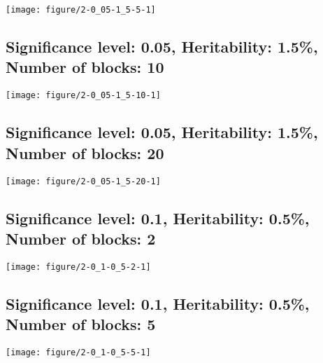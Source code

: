 \documentclass[11pt,letter]{article}\usepackage[]{graphicx}\usepackage[]{color}
\makeatletter
\def\maxwidth{ %
  \ifdim\Gin@nat@width>\linewidth
    \linewidth
  \else
    \Gin@nat@width
  \fi
}
\newenvironment{knitrout}{}{} %
\makeatother
\begin{document}
\begin{knitrout}
\color{fgcolor}
\texttt{[image: figure/2-0\_05-1\_5-5-1]} 

\end{knitrout}

\newpage
\subsection{Significance level: 0.05, Heritability: 1.5\%, Number of blocks: 10}

\begin{knitrout}
\color{fgcolor}
\texttt{[image: figure/2-0\_05-1\_5-10-1]} 

\end{knitrout}

\newpage
\subsection{Significance level: 0.05, Heritability: 1.5\%, Number of blocks: 20}

\begin{knitrout}
\color{fgcolor}
\texttt{[image: figure/2-0\_05-1\_5-20-1]} 

\end{knitrout}

\newpage
\subsection{Significance level: 0.1, Heritability: 0.5\%, Number of blocks: 2}

\begin{knitrout}
\color{fgcolor}
\texttt{[image: figure/2-0\_1-0\_5-2-1]} 

\end{knitrout}

\newpage
\subsection{Significance level: 0.1, Heritability: 0.5\%, Number of blocks: 5}

\begin{knitrout}
\color{fgcolor}
\texttt{[image: figure/2-0\_1-0\_5-5-1]} 

\end{knitrout}
\end{document}
